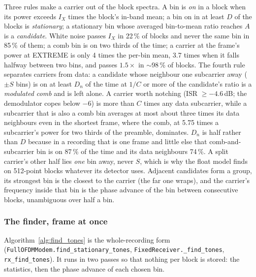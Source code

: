 Three rules make a carrier out of the block spectra.  A bin is
\emph{on} in a block when its power exceeds $I_X$ times the block's
in-band mean; a bin on in at least $D$ of the blocks is
\emph{stationary}; a stationary bin whose averaged bin-to-mean ratio
reaches $A$ is a \emph{candidate}.  White noise passes $I_X$ in 22\,\%
of blocks and never the same bin in 85\,\% of them; a comb bin is on
two thirds of the time; a carrier at the frame's power at EXTREME is
only 4 times the per-bin mean, 3.7 times when it falls halfway
between two bins, and passes $1.5\times$ in $\sim$98\,\% of blocks.  The
fourth rule separates carriers from data: a candidate whose neighbour
one subcarrier away ($\pm S$ bins) is on at least $D_n$ of the time at
$1/C$ or more of the candidate's ratio is a \emph{modulated comb} and
is left alone.  A carrier worth notching (ISR $\ge -4.6$\,dB; the
demodulator copes below $-6$) is more than $C$ times any data
subcarrier, while a subcarrier that is also a comb bin averages at
most about three times its data neighbours even in the shortest
frame, where the comb, at 5.75 times a subcarrier's power for two
thirds of the preamble, dominates.  $D_n$ is half rather than $D$
because in a recording that is one frame and little else that
comb-and-subcarrier bin is on 87\,\% of the time and its data
neighbours 74\,\%.  A split carrier's other half lies \emph{one} bin
away, never $S$, which is why the float model finds on 512-point
blocks whatever its detector uses.  Adjacent candidates form a group,
its strongest bin is the closest to the carrier (the far one wraps),
and the carrier's frequency inside that bin is the phase advance of
the bin between consecutive blocks, unambiguous over half a bin.

\subsubsection*{The finder, frame at once}

Algorithm~\ref{alg:find_tones} is the whole-recording form
(\texttt{FullOFDMModem.find\_stationary\_tones},
\texttt{FixedReceiver.\_find\_tones}, \texttt{rx\_find\_tones}).  It
runs in two passes so that nothing per block is stored: the
statistics, then the phase advance of each chosen bin.

